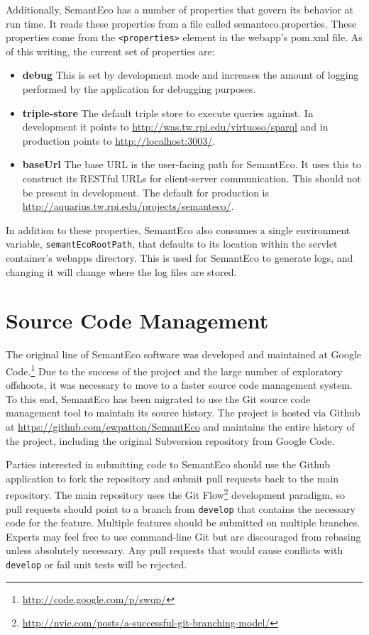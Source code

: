 \documentclass[letterpaper]{report}
\begin{document}
Additionally, SemantEco has a number of properties that govern its behavior at run time. It reads these properties from a file called semanteco.properties. These properties come from the \texttt{<properties>} element in the webapp's pom.xml file. As of this writing, the current set of properties are:

\begin{itemize}
\item \textbf{debug} This is set by development mode and increases the amount of logging performed by the application for debugging purposes.
\item \textbf{triple-store} The default triple store to execute queries against. In development it points to \url{http://was.tw.rpi.edu/virtuoso/sparql} and in production points to \url{http://localhost:3003/}.
\item \textbf{baseUrl} The base URL is the user-facing path for SemantEco. It uses this to construct its RESTful URLs for client-server communication. This should not be present in development. The default for production is \url{http://aquarius.tw.rpi.edu/projects/semanteco/}.
\end{itemize}

In addition to these properties, SemantEco also consumes a single environment variable, \texttt{semantEcoRootPath}, that defaults to its location within the servlet container's webapps directory. This is used for SemantEco to generate logs, and changing it will change where the log files are stored.

\chapter{Source Code Management}
The original line of SemantEco software was developed and maintained at Google Code.\footnote{\url{http://code.google.com/p/swqp/}} Due to the success of the project and the large number of exploratory offshoots, it was necessary to move to a faster source code management system. To this end, SemantEco has been migrated to use the Git source code management tool to maintain its source history. The project is hosted via Github at \url{https://github.com/ewpatton/SemantEco} and maintains the entire history of the project, including the original Subversion repository from Google Code.

Parties interested in submitting code to SemantEco should use the Github application to fork the repository and submit pull requests back to the main repository. The main repository uses the Git Flow\footnote{\url{http://nvie.com/posts/a-successful-git-branching-model/}} development paradigm, so pull requests should point to a branch from \texttt{develop} that contains the necessary code for the feature. Multiple features should be submitted on multiple branches. Experts may feel free to use command-line Git but are discouraged from rebasing unless absolutely necessary. Any pull requests that would cause conflicts with \texttt{develop} or fail unit tests will be rejected.

\renewcommand{\bibname}{References}


\end{document}
